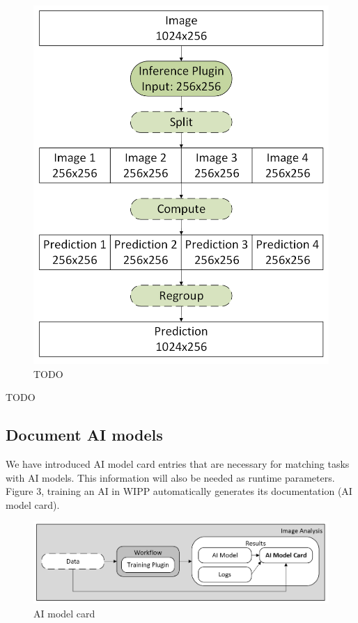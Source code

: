 \begin{figure}[H]
  \centering
  \includegraphics[width=1.0\linewidth]{png/methods/tiling.png}
  \caption{TODO}
\end{figure}

TODO



\subsection{Document AI models}

We have introduced AI model card entries that are necessary for matching tasks
with AI models. This information will also be needed as runtime parameters.
Figure 3, training an AI in WIPP automatically generates its documentation
(AI model card).

\begin{figure}[H]
  \centering
  \includegraphics[width=1.0\linewidth]{png/methods/ai_model_card.png}
  \caption{AI model card}
  \label{fig:3aimodelcard}
\end{figure}

